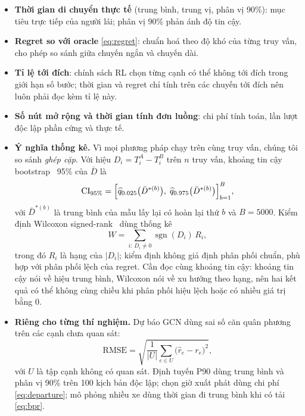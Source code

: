 \begin{itemize}
    \item \textbf{Thời gian di chuyển thực tế} (trung bình, trung vị, phân vị 90\%): mục tiêu trực tiếp của người lái;
    phân vị 90\% phản ánh độ tin cậy.
    \item \textbf{Regret so với oracle} \eqref{eq:regret}: chuẩn hoá theo độ khó của từng truy vấn, cho phép so sánh giữa
    chuyến ngắn và chuyến dài.
    \item \textbf{Tỉ lệ tới đích}: chính sách RL chọn từng cạnh có thể không tới đích trong giới hạn số bước; thời gian và
    regret chỉ tính trên các chuyến tới đích nên luôn phải đọc kèm tỉ lệ này.
    \item \textbf{Số nút mở rộng và thời gian tính đơn luồng}: chi phí tính toán, lần lượt độc lập phần cứng và thực tế.
    \item \textbf{Ý nghĩa thống kê.} Vì mọi phương pháp chạy trên cùng truy vấn, chúng tôi so sánh \emph{ghép cặp}. Với hiệu
    $D_i=T^A_i-T^B_i$ trên $n$ truy vấn, khoảng tin cậy bootstrap~\cite{efron1993} 95\% của $\bar{D}$ là
    \begin{equation}
    \mathrm{CI}_{95\%} = \Bigl[\widehat{q}_{0.025}\bigl(\bar{D}^{\ast(b)}\bigr),\; \widehat{q}_{0.975}\bigl(\bar{D}^{\ast(b)}\bigr)\Bigr]_{b=1}^{B},
    \label{eq:bootstrap}
    \end{equation}
    với $\bar{D}^{\ast(b)}$ là trung bình của mẫu lấy lại có hoàn lại thứ $b$ và $B=5000$. Kiểm định Wilcoxon
    signed-rank~\cite{wilcoxon1945} dùng thống kê
    \begin{equation}
    W = \sum_{i:\,D_i\neq 0} \operatorname{sgn}(D_i)\, R_i,
    \label{eq:wilcoxon}
    \end{equation}
    trong đó $R_i$ là hạng của $|D_i|$; kiểm định không giả định phân phối chuẩn, phù hợp với phân phối lệch của regret. Cần đọc
    cùng khoảng tin cậy: khoảng tin cậy nói về hiệu trung bình, Wilcoxon nói về xu hướng theo hạng, nên hai kết quả có thể không
    cùng chiều khi phân phối hiệu lệch hoặc có nhiều giá trị bằng 0.
    \item \textbf{Riêng cho từng thí nghiệm.} Dự báo GCN dùng sai số căn quân phương trên các cạnh chưa quan sát:
    \begin{equation}
    \mathrm{RMSE} = \sqrt{\frac{1}{|U|}\sum_{e\in U}\bigl(\hat{r}_e - r_e\bigr)^2},
    \label{eq:rmse}
    \end{equation}
    với $U$ là tập cạnh không có quan sát. Định tuyến P90 dùng trung bình và phân vị 90\% trên 100 kịch bản độc lập; chọn
    giờ xuất phát dùng chi phí \eqref{eq:departure}; mô phỏng nhiều xe dùng thời gian đi trung bình khi có tải \eqref{eq:bpr}.
\end{itemize}

